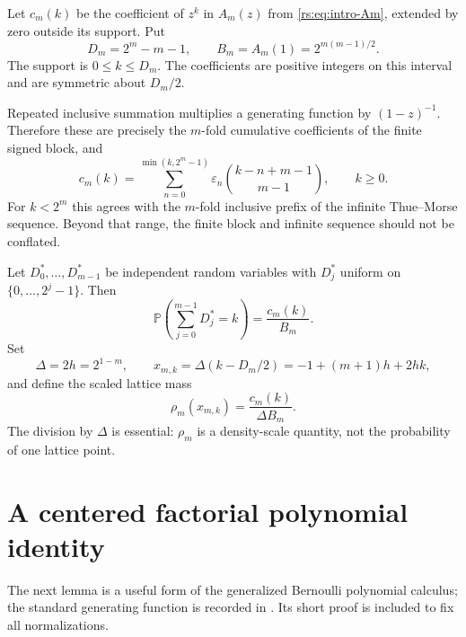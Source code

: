 \documentclass[11pt,a4paper,oneside,openany]{book}
\numberwithin{equation}{chapter}
\theoremstyle{definition}
\theoremstyle{remark}
\newcommand{\eps}{\varepsilon}
\newcommand{\Prob}{\mathbb P}
\begin{document}
Let $c_m(k)$ be the coefficient of $z^k$ in $A_m(z)$ from
\eqref{rs:eq:intro-Am}, extended by zero outside its support. Put
\begin{equation}
 D_m=2^m-m-1,\qquad B_m=A_m(1)=2^{m(m-1)/2}.
 \label{rs:eq:DB}
\end{equation}
The support is $0\leq k\leq D_m$. The coefficients are positive
integers on this interval and are symmetric about $D_m/2$.

Repeated inclusive summation multiplies a generating function by
$(1-z)^{-1}$. Therefore these are precisely the $m$-fold cumulative
coefficients of the finite signed block, and
\begin{equation}
 c_m(k)=\sum_{n=0}^{\min(k,2^m-1)}
            \eps_n\binom{k-n+m-1}{m-1},\qquad k\geq0.
 \label{rs:eq:c-binomial}
\end{equation}
For $k<2^m$ this agrees with the $m$-fold inclusive prefix of the
infinite Thue--Morse sequence. Beyond that range, the finite block
and infinite sequence should not be conflated.

Let $D_0^*,\ldots,D_{m-1}^*$ be independent random variables with
$D_j^*$ uniform on $\{0,\ldots,2^j-1\}$. Then
\begin{equation}
 \Prob\left(\sum_{j=0}^{m-1}D_j^*=k\right)=\frac{c_m(k)}{B_m}.
 \label{rs:eq:c-probability}
\end{equation}
Set
\begin{equation}
 \Delta=2h=2^{1-m},\qquad
 x_{m,k}=\Delta(k-D_m/2)=-1+(m+1)h+2hk,
 \label{rs:eq:lattice-nodes}
\end{equation}
and define the scaled lattice mass
\begin{equation}
 \rho_m(x_{m,k})=\frac{c_m(k)}{\Delta B_m}.
 \label{rs:eq:rho}
\end{equation}
The division by $\Delta$ is essential: $\rho_m$ is a density-scale
quantity, not the probability of one lattice point.

\section{A centered factorial polynomial identity}

The next lemma is a useful form of the generalized Bernoulli
polynomial calculus; the standard generating function is recorded in
\cite{dlmf422}. Its short proof is included to fix all normalizations.
\end{document}
